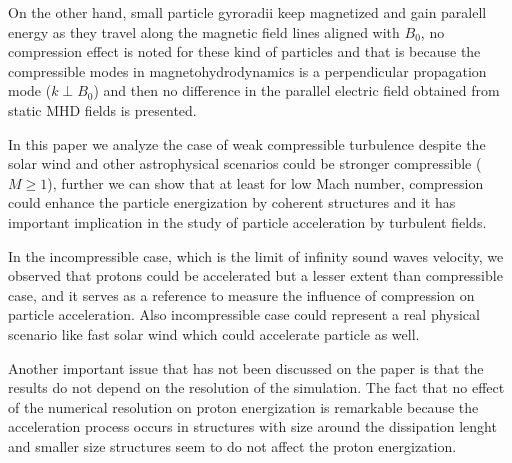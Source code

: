 \documentclass[%
aip,pop,amsmath,amssymb,
 reprint,%
]{revtex4-1}
\begin{document}
On the other hand, small particle gyroradii keep magnetized and gain paralell energy as 
they travel along the magnetic field lines aligned with $B_0$, no compression effect is
noted for these kind of particles and that is because the compressible modes in 
magnetohydrodynamics is a perpendicular propagation mode ($k \perp B_0$) and then no
difference in the parallel electric field obtained from static MHD fields is presented.

In this paper we analyze the case of weak compressible turbulence despite the solar wind
and other astrophysical scenarios could be stronger compressible ($M \geq 1$), further we
can show that at least for low Mach number, compression could enhance the particle
energization by coherent structures and it has important implication in the study of
particle acceleration by turbulent fields.

In the incompressible case, which is the limit of infinity sound waves velocity, we 
observed that protons could be accelerated but a lesser extent than compressible case, 
and it serves as a reference to measure the influence of compression on particle 
acceleration. Also incompressible case could represent a real physical scenario like fast
solar wind which could accelerate particle as well.


Another important issue that has not been discussed on the paper is that the results do 
not depend on the resolution of the simulation. The fact that no effect of the numerical
resolution on proton energization is remarkable because the acceleration process occurs in
structures with size around  the dissipation  lenght and smaller size structures seem
to do not affect the proton energization.

\nocite{*}

\end{document}
